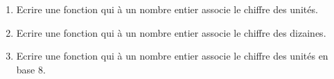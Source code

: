 \question{}
\begin{enumerate}
	\item Ecrire une fonction qui à un nombre entier associe le chiffre des unités.
	\item Ecrire une fonction qui à un nombre entier associe le chiffre des dizaines.
	\item Ecrire une fonction qui à un nombre entier associe le chiffre des unités en base 8.
\end{enumerate}
